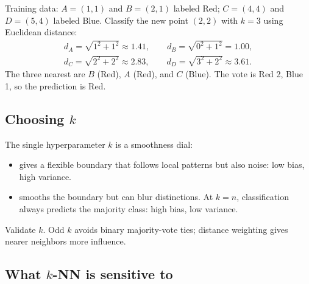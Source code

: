 \begin{workedexample}
Training data: $A=(1,1)$ and $B=(2,1)$ labeled Red; $C=(4,4)$ and $D=(5,4)$ labeled Blue. Classify the new point $(2,2)$ with $k=3$ using Euclidean distance:
\begin{gather*}
  d_A=\sqrt{1^2+1^2}\approx 1.41,\qquad
  d_B=\sqrt{0^2+1^2}=1.00,\\
  d_C=\sqrt{2^2+2^2}\approx 2.83,\qquad
  d_D=\sqrt{3^2+2^2}\approx 3.61.
\end{gather*}
The three nearest are $B$ (Red), $A$ (Red), and $C$ (Blue). The vote is Red 2, Blue 1, so the prediction is Red.
\end{workedexample}

\subsection{Choosing $k$}

The single hyperparameter $k$ is a smoothness dial:

\begin{itemize}
  \item {} gives a flexible boundary that follows local patterns but also noise: low bias, high variance.
  \item {} smooths the boundary but can blur distinctions. At $k=n$, classification always predicts the majority class: high bias, low variance.
\end{itemize}

Validate $k$. Odd $k$ avoids binary majority-vote ties; distance weighting gives nearer neighbors more influence.

\subsection{What $k$-NN is sensitive to}

